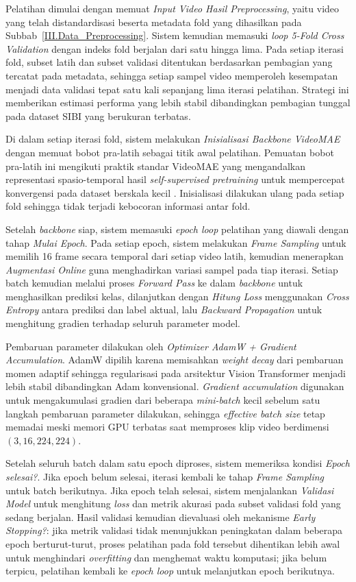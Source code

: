 Pelatihan dimulai dengan memuat \textit{Input Video Hasil Preprocessing}, yaitu video yang telah distandardisasi beserta metadata fold yang dihasilkan pada Subbab~\ref{III.Data_Preprocessing}. Sistem kemudian memasuki \textit{loop 5-Fold Cross Validation} dengan indeks fold berjalan dari satu hingga lima. Pada setiap iterasi fold, subset latih dan subset validasi ditentukan berdasarkan pembagian yang tercatat pada metadata, sehingga setiap sampel video memperoleh kesempatan menjadi data validasi tepat satu kali sepanjang lima iterasi pelatihan. Strategi ini memberikan estimasi performa yang lebih stabil dibandingkan pembagian tunggal pada dataset SIBI yang berukuran terbatas.

Di dalam setiap iterasi fold, sistem melakukan \textit{Inisialisasi Backbone VideoMAE} dengan memuat bobot pra-latih sebagai titik awal pelatihan. Pemuatan bobot pra-latih ini mengikuti praktik standar VideoMAE yang mengandalkan representasi spasio-temporal hasil \textit{self-supervised pretraining} untuk mempercepat konvergensi pada dataset berskala kecil \cite{Tong2022VideoMAE}. Inisialisasi dilakukan ulang pada setiap fold sehingga tidak terjadi kebocoran informasi antar fold.

Setelah \textit{backbone} siap, sistem memasuki \textit{epoch loop} pelatihan yang diawali dengan tahap \textit{Mulai Epoch}. Pada setiap epoch, sistem melakukan \textit{Frame Sampling} untuk memilih 16 frame secara temporal dari setiap video latih, kemudian menerapkan \textit{Augmentasi Online} guna menghadirkan variasi sampel pada tiap iterasi. Setiap batch kemudian melalui proses \textit{Forward Pass} ke dalam \textit{backbone} untuk menghasilkan prediksi kelas, dilanjutkan dengan \textit{Hitung Loss} menggunakan \textit{Cross Entropy} antara prediksi dan label aktual, lalu \textit{Backward Propagation} untuk menghitung gradien terhadap seluruh parameter model.

Pembaruan parameter dilakukan oleh \textit{Optimizer AdamW + Gradient Accumulation}. AdamW dipilih karena memisahkan \textit{weight decay} dari pembaruan momen adaptif sehingga regularisasi pada arsitektur Vision Transformer menjadi lebih stabil dibandingkan Adam konvensional. \textit{Gradient accumulation} digunakan untuk mengakumulasi gradien dari beberapa \textit{mini-batch} kecil sebelum satu langkah pembaruan parameter dilakukan, sehingga \textit{effective batch size} tetap memadai meski memori GPU terbatas saat memproses klip video berdimensi $(3,16,224,224)$.

Setelah seluruh batch dalam satu epoch diproses, sistem memeriksa kondisi \textit{Epoch selesai?}. Jika epoch belum selesai, iterasi kembali ke tahap \textit{Frame Sampling} untuk batch berikutnya. Jika epoch telah selesai, sistem menjalankan \textit{Validasi Model} untuk menghitung \textit{loss} dan metrik akurasi pada subset validasi fold yang sedang berjalan. Hasil validasi kemudian dievaluasi oleh mekanisme \textit{Early Stopping?}: jika metrik validasi tidak menunjukkan peningkatan dalam beberapa epoch berturut-turut, proses pelatihan pada fold tersebut dihentikan lebih awal untuk menghindari \textit{overfitting} dan menghemat waktu komputasi; jika belum terpicu, pelatihan kembali ke \textit{epoch loop} untuk melanjutkan epoch berikutnya.

